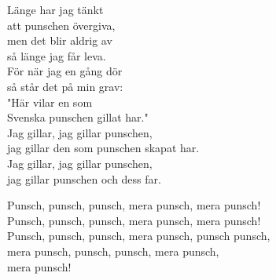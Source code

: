 \documentclass[a6paper, 10pt, twoside]{article}
\begin{document}
\noindent
\begin{center}
\end{center}
\begin{lyrics}
Länge har jag tänkt\\
att punschen övergiva,\\
men det blir aldrig av\\
så länge jag får leva.\\
För när jag en gång dör\\
så står det på min grav:\\
"Här vilar en som\\
Svenska punschen gillat har."
\vspace{5pt}\\
Jag gillar, jag gillar punschen,\\
jag gillar den som punschen skapat har.\\
Jag gillar, jag gillar punschen,\\
jag gillar punschen och dess far.
\end{lyrics}
\vfill
\begin{center}
\end{center}
\begin{lyrics}
Punsch, punsch, punsch, mera punsch, mera punsch!\\
Punsch, punsch, punsch, mera punsch, mera punsch!
\vspace{5pt}\\
Punsch, punsch, punsch, mera punsch, \physicalonly{\\}punsch punsch,\\
mera punsch, punsch, punsch, mera punsch,\\
mera punsch!
\end{lyrics}
\end{document}
